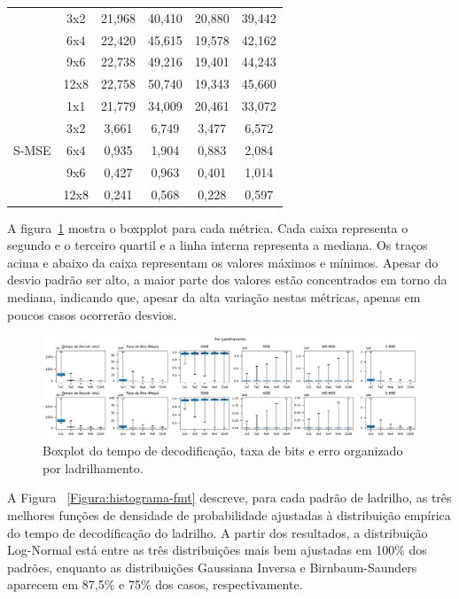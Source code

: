 \begin{longtable}{|c|c|c|c|c|c|}
        & 3x2  & 21,968    & 40,410     & 20,880    & 39,442   \\  \cline{2-6}
        & 6x4  & 22,420    & 45,615     & 19,578    & 42,162   \\  \cline{2-6}
        & 9x6  & 22,738    & 49,216     & 19,401    & 44,243   \\  \cline{2-6}
        & 12x8 & 22,758    & 50,740     & 19,343    & 45,660   \\  \hline
        \multirow{5}{*}{S-MSE}  & 1x1  & 21,779    & 34,009     & 20,461    & 33,072   \\  \cline{2-6}
        & 3x2  & 3,661     & 6,749      & 3,477     & 6,572    \\  \cline{2-6}
        & 6x4  & 0,935     & 1,904      & 0,883     & 2,084    \\  \cline{2-6}
        & 9x6  & 0,427     & 0,963      & 0,401     & 1,014    \\  \cline{2-6}
        & 12x8 & 0,241     & 0,568      & 0,228     & 0,597
\end{longtable}

A figura~\ref{Fig:boxplottiling} mostra o boxpplot para cada métrica. Cada caixa representa o segundo e o terceiro quartil e a linha interna representa a mediana. Os traços acima e abaixo da caixa representam os valores máximos e mínimos. Apesar do desvio padrão ser alto, a maior parte dos valores estão concentrados em torno da mediana, indicando que, apesar da alta variação nestas métricas, apenas em poucos casos ocorrerão desvios.

\begin{figure}[h]
         \centering

           \includegraphics[width=0.9\columnwidth]{fig/ByPattern/boxplot_pattern.pdf}
           \caption{Boxplot do tempo de decodificação, taxa de bits e erro organizado por ladrilhamento.}
           \label{Fig:boxplottiling}
\end{figure}


A Figura ~\ref{Figura:histograma-fmt} descreve, para cada padrão de ladrilho, as três melhores funções de densidade de probabilidade ajustadas à distribuição empírica do tempo de decodificação do ladrilho. A partir dos resultados, a distribuição Log-Normal está entre as três distribuições mais bem ajustadas em 100\% dos padrões, enquanto as distribuições Gaussiana Inversa e Birnbaum-Saunders aparecem em 87,5\% e 75\% dos casos, respectivamente.


